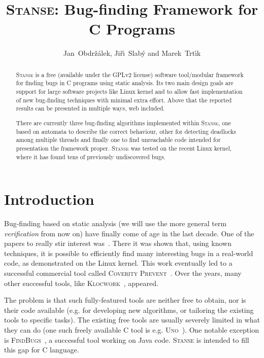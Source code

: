 \documentclass[10pt]{llncs}
\newcommand{\Stanse}{\textsc{Stanse}\xspace}
\begin{document}
\title{\Stanse: Bug-finding Framework for C Programs}
\author{Jan~Obdr\v{z}\'alek, Ji\v{r}\'\i~Slab\'y and Marek~Trt\'{\i}k}

\maketitle

\begin{abstract}
  \Stanse is a free (available under the GPLv2 license) software tool/modular
  framework for finding bugs in C programs using static analysis. Its two
  main design goals are support for large software projects like Linux
  kernel and to allow fast implementation of new bug-finding techniques with
  minimal extra effort. Above that the reported results can be presented in
  multiple ways, web included.
  
  There are currently three bug-finding algorithms implemented within \Stanse,
  one based on automata to describe the correct behaviour, other for detecting
  deadlocks among multiple threads and finally one to find unreachable code
  intended for presentation the framework proper. \Stanse was tested on the
  recent Linux kernel, where it has found tens of previously undiscovered
  bugs.
\end{abstract}

\section{Introduction}
\label{sec:introduction}

Bug-finding based on static analysis (we will use the more general term
\emph{verification} from now on) have finally come of age in the last
decade. One of the papers to really stir interest was~\cite{ECCH00}. There it
was shown that, using known techniques, it is possible to efficiently find
many interesting bugs in a real-world code, as demonstrated on the Linux
kernel.  This work eventually led to a successful commercial tool called
\textsc{Coverity Prevent}~\cite{coverity}. Over the years, many other
successful tools, like \textsc{Klocwork}~\cite{klocwork}, appeared.

The problem is that such fully-featured tools are neither free to obtain, nor
is their code available (e.g. for developing new algorithms, or tailoring the
existing tools to specific tasks). The existing free tools are usually
severely limited in what they can do (one such freely available C
tool is e.g. \textsc{Uno}~\cite{uno}). One notable exception is
\textsc{FindBugs}~\cite{HP04,findbugs}, a successful tool working on Java
code. \Stanse is intended to fill this gap for C language.
\end{document}
